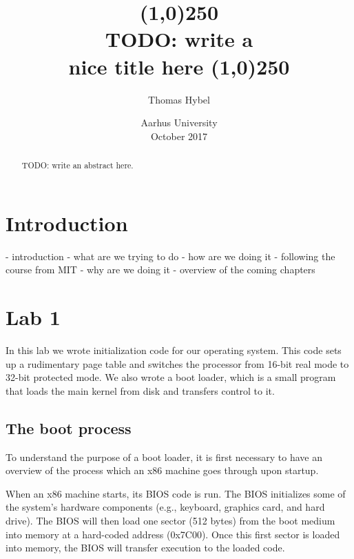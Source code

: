 \documentclass{article}
\title{
\line(1,0){250}\\
\Large \bfseries
TODO: write a \\
nice title here
\line(1,0){250}
}
\author{Thomas Hybel}
\date{Aarhus University \\ October 2017}
\begin{document}
\maketitle

\begin{abstract} 
\noindent 
TODO: write an abstract here.
\end{abstract}
\newpage

\tableofcontents
\newpage
{}




\section*{Introduction}


- introduction
	- what are we trying to do
	- how are we doing it
		- following the course from MIT
	- why are we doing it
	- overview of the coming chapters




\section*{Lab 1}

In this lab we wrote initialization code for our operating system. This code
sets up a rudimentary page table and switches the processor from 16-bit real
mode to 32-bit protected mode. We also wrote a boot loader, which is a small
program that loads the main kernel from disk and transfers control to it.

\subsection*{The boot process}
To understand the purpose of a boot loader, it is first necessary to have an
overview of the process which an x86 machine goes through upon startup.

When an x86 machine starts, its BIOS code is run. The BIOS initializes some of
the system's hardware components (e.g., keyboard, graphics card, and hard
drive). The BIOS will then load one sector (512 bytes) from the boot medium
into memory at a hard-coded address (0x7C00). Once this first sector is loaded
into memory, the BIOS will transfer execution to the loaded code.
\end{document}
